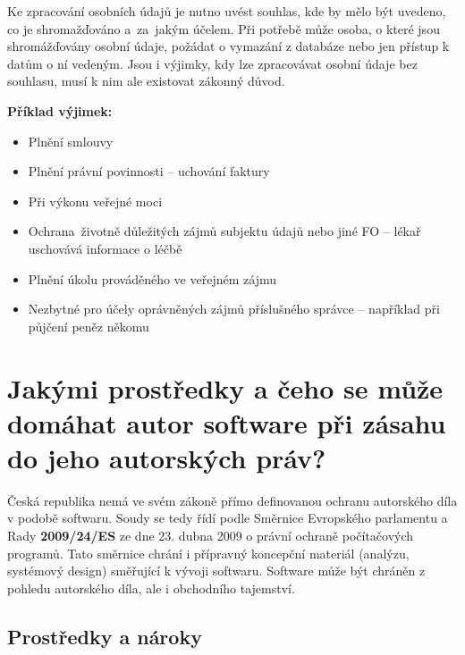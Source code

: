 Ke zpracování osobních údajů je nutno uvést souhlas, kde by mělo být uvedeno, co je shromažďováno a~za~jakým účelem. Při potřebě může osoba, o které jsou shromážďovány osobní údaje, požádat o vymazání z databáze nebo jen přístup k datům o ní vedeným. Jsou i výjimky, kdy lze zpracovávat osobní údaje bez souhlasu, musí k nim ale existovat zákonný důvod.

\newpage
\noindent\textbf{Příklad výjimek:}
\begin{itemize}[noitemsep]
    \item Plnění smlouvy
    \item Plnění právní povinnosti -- uchování faktury
    \item Při výkonu veřejné moci
    \item Ochrana~životně důležitých zájmů subjektu údajů nebo jiné FO -- lékař uschovává informace o léčbě
    \item Plnění úkolu prováděného ve veřejném zájmu
    \item Nezbytné pro účely oprávněných zájmů příslušného správce -- například při půjčení peněz někomu
\end{itemize}


\section{Jakými prostředky a čeho se může domáhat autor software při zásahu do jeho autorských práv?}
Česká republika nemá ve svém zákoně přímo definovanou ochranu autorského díla v podobě softwaru. Soudy se tedy řídí podle Směrnice Evropského parlamentu a Rady \textbf{2009/24/ES} ze dne 23. dubna 2009 o právní ochraně počítačových programů. Tato směrnice chrání i přípravný koncepční materiál (analýzu, systémový design) směřující k vývoji softwaru. Software může být chráněn z pohledu autorského díla, ale i obchodního tajemství.


\subsection{Prostředky a nároky}

